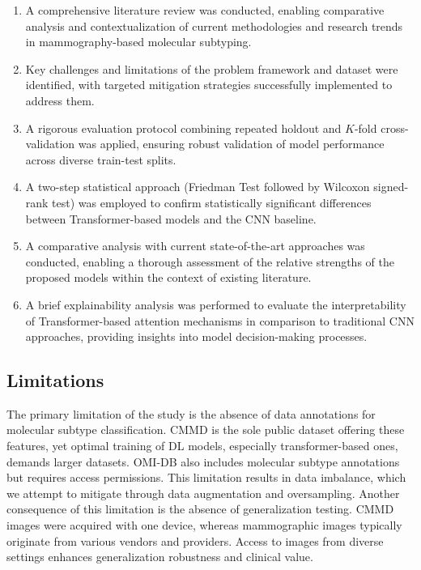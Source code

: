 \documentclass[a4paper,10pt]{book}
\begin{document}
\begin{enumerate}[label=\Roman*.]
\item A comprehensive literature review was conducted, enabling comparative analysis and contextualization of current methodologies and research trends in mammography-based molecular subtyping.

\item Key challenges and limitations of the problem framework and dataset were identified, with targeted mitigation strategies successfully implemented to address them.

\item A rigorous evaluation protocol combining repeated holdout and $K$-fold cross-validation was applied, ensuring robust validation of model performance across diverse train-test splits.

\item A two-step statistical approach (Friedman Test followed by Wilcoxon signed-rank test) was employed to confirm statistically significant differences between Transformer-based models and the CNN baseline.

\item A comparative analysis with current state-of-the-art approaches was conducted, enabling a thorough assessment of the relative strengths of the proposed models within the context of existing literature.

\item A brief explainability analysis was performed to evaluate the interpretability of Transformer-based attention mechanisms in comparison to traditional CNN approaches, providing insights into model decision-making processes.
\end{enumerate}


\subsection{Limitations}

The primary limitation of the study is the absence of data annotations for molecular subtype classification. CMMD is the sole public dataset offering these features, yet optimal training of DL models, especially transformer-based ones, demands larger datasets. OMI-DB also includes molecular subtype annotations but requires access permissions. This limitation results in data imbalance, which we attempt to mitigate through data augmentation and oversampling. Another consequence of this limitation is the absence of generalization testing. CMMD images were acquired with one device, whereas mammographic images typically originate from various vendors and providers. Access to images from diverse settings enhances generalization robustness and clinical value.
\end{document}
